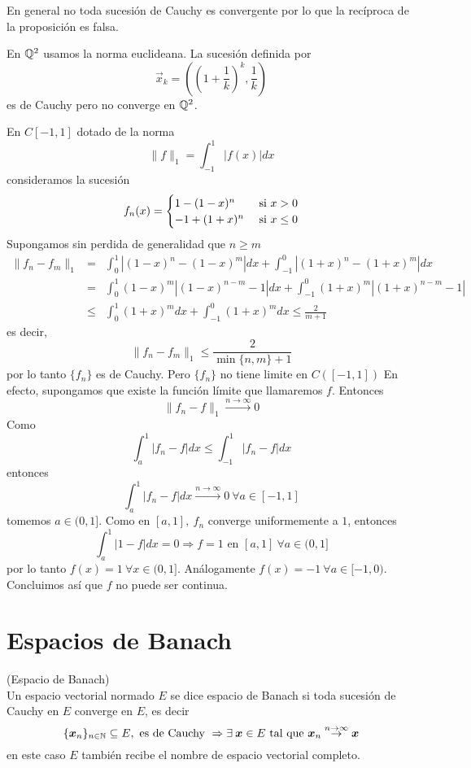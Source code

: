 \begin{nota}
En general no toda sucesi\'on de Cauchy es convergente por lo que la rec\'iproca de la proposici\'on es falsa.
\end{nota}

\begin{ejemplo} 
En $\mathbb{Q}^2$ usamos la norma euclideana. La sucesi\'on definida por 
$$\vec{x}_k=\left(\left(1+\frac{1}{k}\right)^k,\frac{1}{k}\right)$$
es de Cauchy pero no converge en $\mathbb{Q}^2$.
\end{ejemplo}

\begin{ejemplo}
En $C[-1,1]$ dotado de la norma
$$\|f\|_1=\int_{-1}^1|f(x)|dx$$ 
consideramos la sucesi\'on
$$f_n(x)=\begin{cases}
1-(1-x)^n  & \text{ si } x>0 \cr 
-1+(1+x)^n & \text{ si } x\leq 0
\end{cases}$$
Supongamos sin perdida de generalidad que $n\geq m$
\begin{eqnarray*}
\|f_n-f_m\|_1  &=& \int_0^1|(1-x)^n-(1-x)^m|dx+\int_{-1}^0|(1+x)^n-(1+x)^m|dx \\ 
               &=& \int_0^1(1-x)^m|(1-x)^{n-m}-1|dx+\int_{-1}^0(1+x)^m|(1+x)^{n-m}-1| \\ 
                 & \leq &\int_0^1(1+x)^mdx+\int_{-1}^0(1+x)^mdx\leq \frac{2}{m+1}  
\end{eqnarray*} 
es decir,
$$\|f_n-f_m\|_1\leq \frac{2}{\min\{n,m\}+1}$$ 
por lo tanto $\{f_n\}$ es de Cauchy. Pero $\{f_n\}$ no tiene limite en $C([-1,1])$ En efecto, supongamos que existe la funci\'on l\'imite que llamaremos $f$. Entonces
$$\|f_n-f\|_1\stackrel{n\to\infty}{\to} 0$$ 
Como
$$\int_a^1|f_n-f|dx\leq\int_{-1}^1|f_n-f|dx$$ 
entonces
$$\int_a^1|f_n-f|dx\stackrel{n\to\infty}{\to}0\: \forall a\in[-1,1]$$ 
tomemos $a\in (0,1]$. Como en $[a,1],\:f_n$ converge uniformemente a $1$, entonces
$$\int_a^1|1-f|dx=0\Rightarrow f=1\text{ en }[a,1]\: \forall a\in (0,1]$$ 
por lo tanto $f(x)=1\:\forall x\in (0,1]$. An\'alogamente $f(x)=-1 \:\forall a\in [-1,0)$. Concluimos as\'i que $f$ no puede ser continua. 
\end{ejemplo}

\section{Espacios de Banach}

\begin{definicion}{\rm (Espacio de Banach)}
\\Un espacio vectorial normado $E$ se dice espacio de Banach si toda sucesi\'on de Cauchy en $E$ converge en $E$, es decir
$$\{\boldsymbol{x}_n\}_{n\in\mathbb{N}}\subseteq E,\text{ es de Cauchy }\Rightarrow\exists\:\boldsymbol{x}\in E \text{ tal que } \boldsymbol{x}_n\stackrel{n\to\infty}{\to}\boldsymbol{x}$$
en este caso $E$ tambi\'en recibe el nombre de espacio vectorial completo.
\end{definicion}

